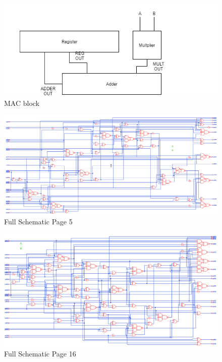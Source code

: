 \documentclass[11pt]{article}
\begin{document}
	
	\begin{figure}[H] 
		\centering 
		\includegraphics[width=0.7\linewidth]{"Pictures/MAC-block"}
		\caption{MAC block} 
		\label{fig:MAC-block} 
	\end{figure}
	
	
	\begin{figure}[H] 
		\centering 
		\includegraphics[width=0.7\linewidth]{"Pictures/Full Schematic Page 5"}
		\caption{Full Schematic Page 5} 
		\label{fig:Full-Schematic-Page-5} 
	\end{figure}
	
	
	\begin{figure}[H] 
		\centering 
		\includegraphics[width=0.7\linewidth]{"Pictures/Full Schematic Page 16"}
		\caption{Full Schematic Page 16} 
		\label{fig:Full-Schematic-Page-16} 
	\end{figure}
	
\end{document}
